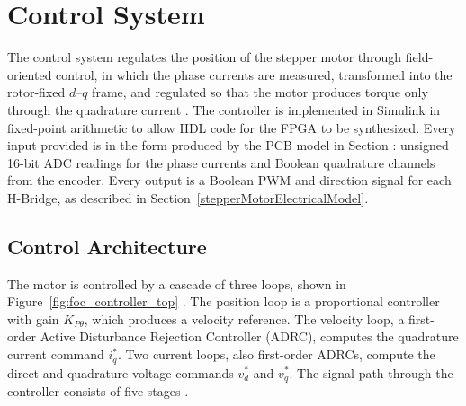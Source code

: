 

\section{Control System}\label{sec:controlSystem}

The control system regulates the position of the stepper motor through
field-oriented control, in which the phase currents are measured, transformed into the rotor-fixed $d$--$q$ frame, and regulated so that the motor produces torque only through the quadrature current \cite{benchaib_discrete-time_2003,bernardi_performance_2022}. The controller is implemented in Simulink in fixed-point arithmetic to allow HDL code for the FPGA to be synthesized. Every input provided is in the form produced by the PCB model in Section : unsigned 16-bit ADC readings for the phase currents and Boolean quadrature channels from the encoder. Every output is a Boolean PWM and direction signal for each H-Bridge, as described in Section~\ref{stepperMotorElectricalModel}.

\subsection{Control Architecture}\label{sec:ctrlArchitecture}

The motor is controlled by a cascade of three loops, shown in Figure~\ref{fig:foc_controller_top} %
. The position loop is a proportional controller with gain $K_{P\theta}$, which produces a velocity reference. The velocity loop, a first-order Active Disturbance Rejection Controller (ADRC), computes the quadrature current command $i_q^{*}$. Two current loops, also first-order ADRCs, compute the direct and quadrature voltage commands $v_d^{*}$ and $v_q^{*}$. The signal path through the controller consists of five stages \cite{altintas_manufacturing_2012}.



